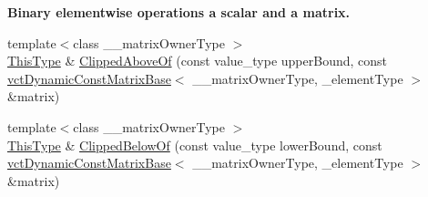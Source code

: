 \begin{Indent}{\bf Binary elementwise operations a scalar and a matrix.}
\begin{DoxyCompactItemize}
\item 
{\footnotesize template$<$class \-\_\-\-\_\-matrix\-Owner\-Type $>$ }\\\hyperlink{classvct_dynamic_const_matrix_base_ac4ff48cbe4d9de3fdef5a02447ffb9db}{This\-Type} \& \hyperlink{classvct_dynamic_matrix_base_ac047486d2126001761d88dbd6f1dd89c}{Clipped\-Above\-Of} (const value\-\_\-type upper\-Bound, const \hyperlink{classvct_dynamic_const_matrix_base}{vct\-Dynamic\-Const\-Matrix\-Base}$<$ \-\_\-\-\_\-matrix\-Owner\-Type, \-\_\-element\-Type $>$ \&matrix)
\item 
{\footnotesize template$<$class \-\_\-\-\_\-matrix\-Owner\-Type $>$ }\\\hyperlink{classvct_dynamic_const_matrix_base_ac4ff48cbe4d9de3fdef5a02447ffb9db}{This\-Type} \& \hyperlink{classvct_dynamic_matrix_base_af932e2333a7c1307baabaad78f216a7e}{Clipped\-Below\-Of} (const value\-\_\-type lower\-Bound, const \hyperlink{classvct_dynamic_const_matrix_base}{vct\-Dynamic\-Const\-Matrix\-Base}$<$ \-\_\-\-\_\-matrix\-Owner\-Type, \-\_\-element\-Type $>$ \&matrix)
\end{DoxyCompactItemize}
\end{Indent}

